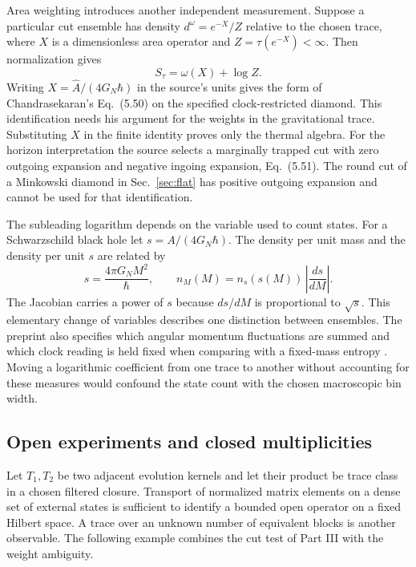 \documentclass[11pt,letterpaper]{article}
\begin{document}
Area weighting introduces another independent measurement.
Suppose a particular cut ensemble has density \(d^\omega=e^{-X}/Z\)
relative to the chosen trace, where \(X\) is a dimensionless area
operator and \(Z=\tau(e^{-X})<\infty\). Then normalization gives
\[
 S_\tau=\omega(X)+\log Z .
\]
Writing \(X=\widehat A/(4G_N\hbar)\) in the source's units gives the
form of Chandrasekaran's Eq.~(5.50) on the specified clock-restricted
diamond. This identification needs his argument for the weights in the
gravitational trace. Substituting \(X\) in the finite identity proves
only the thermal algebra. For the horizon interpretation the source
selects a marginally trapped cut with zero outgoing expansion and negative
ingoing expansion, Eq.~(5.51). The round cut of a Minkowski diamond in
Sec.~\ref{sec:flat} has positive outgoing expansion and cannot be used
for that identification.

The subleading logarithm depends on the variable used to count states.
For a Schwarzschild black hole let \(s=A/(4G_N\hbar)\). The density
per unit mass and the density per unit \(s\) are related by
\[
 s=\frac{4\pi G_N M^2}{\hbar},\qquad
 n_M(M)=n_s(s(M))\,\left|\frac{ds}{dM}\right| .
\]
The Jacobian carries a power of \(s\)
because \(ds/dM\) is proportional to \(\sqrt s\). This elementary
change of variables describes one distinction between ensembles. The
preprint also specifies which angular momentum fluctuations are summed
and which clock reading is held fixed when comparing with a fixed-mass
entropy \cite[Sec.~5.3, Eq.~(5.69)]{nc}. Moving a logarithmic coefficient
from one trace to another without accounting for these measures would
confound the state count with the chosen macroscopic bin width.

\subsection{Open experiments and closed multiplicities}
Let \(T_1,T_2\) be two adjacent evolution kernels and let their product
be trace class in a chosen filtered closure. Transport of normalized
matrix elements on a dense set of external states is sufficient to
identify a bounded open operator on a fixed Hilbert space. A trace
over an unknown number of equivalent blocks is another observable.
The following example combines the cut test of Part III with the
weight ambiguity.
\end{document}
